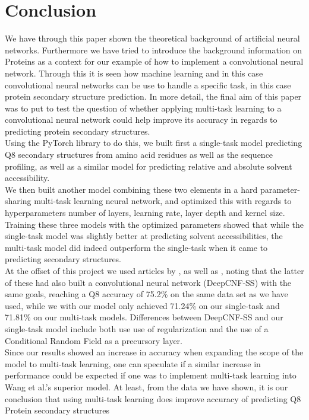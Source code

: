 \section{Conclusion}
We have through this paper shown the theoretical background of artificial neural networks. Furthermore we have tried to introduce the background information on Proteins as a context for our example of how to implement a convolutional neural network. Through this it is seen how machine learning and in this case convolutional neural networks can be use to handle a specific task, in this case protein secondary structure prediction. In more detail, the final aim of this paper was to put to test the question of whether applying multi-task learning to a convolutional neural network could help improve its accuracy in regards to predicting protein secondary structures.\\
Using the PyTorch library to do this, we built first a single-task model predicting Q8 secondary structures from amino acid residues as well as the sequence profiling, as well as a similar model for predicting relative and absolute solvent accessibility.\\
We then built another model combining these two elements in a hard parameter-sharing multi-task learning neural network, and optimized this with regards to hyperparameters number of layers, learning rate, layer depth and kernel size.\\
Training these three models with the optimized parameters showed that while the single-task model was slightly better at predicting solvent accessibilities, the multi-task model did indeed outperform the single-task when it came to predicting secondary structures.\\
At the offset of this project we used articles by \citeauthor{qi-et-al-2012}, \citeauthor{zhou-and-troyanskaya-2014} as well as \citeauthor{wang-et-al-2016}, noting that the latter of these had also built a convolutional neural network (DeepCNF-SS) with the same goals, reaching a Q8 accuracy of 75.2\% on the same data set as we have used, while we with our model only achieved 71.24\% on our single-task and 71.81\% on our multi-task models. Differences between DeepCNF-SS and our single-task model include both use use of regularization and the use of a Conditional Random Field as a precursory layer. \\
Since our results showed an increase in accuracy when expanding the scope of the model to multi-task learning, one can speculate if a similar increase in performance could be expected if one was to implement multi-task learning into Wang et al.'s superior model. At least, from the data we have shown, it is our conclusion that using multi-task learning does improve accuracy of predicting Q8 Protein secondary structures\\
